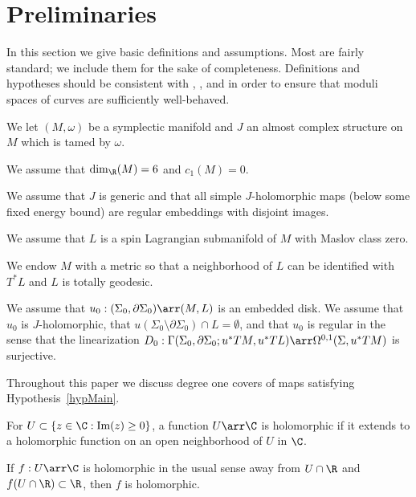 \section{Preliminaries} \label{prelim}

In this section we give basic definitions and assumptions. Most are fairly standard; we include them for the sake of completeness. Definitions and hypotheses should be consistent with \cite{katzLiu}, \cite{liu}, and \cite{ortn} in order to ensure that moduli spaces of curves are sufficiently well-behaved.

We let $(M,\omega)$ be a symplectic manifold and $J$ an almost complex structure on $M$ which is tamed by $\omega$.

\begin{hypothesis} \label{hypL}
We assume that  $\dim_\R(M)=6$ and $c_1(M)=0$.

We assume that $J$ is generic and that all simple $J$-holomorphic maps (below some fixed energy bound) are regular embeddings with disjoint images.

We assume that $L$ is a spin Lagrangian submanifold of $M$ with Maslov class zero.
\end{hypothesis}

We endow $M$ with a metric so that a neighborhood of $L$ can be identified with $T^*L$ and $L$ is totally geodesic.

\begin{hypothesis} \label{hypMain}
We assume that $u_0:(\Sigma_0,\partial\Sigma_0)\arr(M,L)$ is an embedded disk. We assume that $u_0$ is $J$-holomorphic, that $u(\Sigma_0 \setminus \partial\Sigma_0) \cap L = \emptyset$, and that $u_0$ is regular in the sense that the linearization $D_0:\Gamma(\Sigma_0,\partial\Sigma_0;u^*TM,u^*TL)\arr\Omega^{0,1}(\Sigma,u^*TM)$ is surjective.
\end{hypothesis}

Throughout this paper we discuss degree one covers of maps satisfying Hypothesis~\ref{hypMain}.

\begin{definition}
For $U \subset \{z \in \C: \text{Im}(z) \geq 0\}$, a function $U \arr \C$ is holomorphic if it extends to a holomorphic function on an open neighborhood of $U$ in $\C$.
\end{definition}

\begin{proposition}
If $f:U \arr \C$ is holomorphic in the usual sense away from $U \cap \R$ and $f(U \cap \R) \subset \R$, then $f$ is holomorphic.
\end{proposition}

